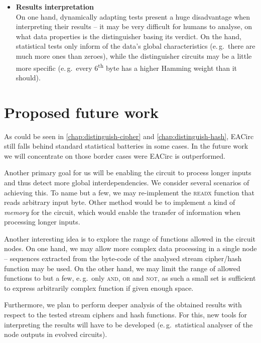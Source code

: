 \documentclass[12pt,oneside]{fithesis2}		%
\renewcommand{\_}{\leavevmode \kern0.0em\vbox{\hrule width0.4em}}
\newcommand{\squarebullet}{\textcolor{black}{\raisebox{0.15em}{\rule{4pt}{4pt}}}}
\newenvironment{myItemize}{
  \begin{itemize}[leftmargin=2em,rightmargin=1em,itemsep=\parskip ,parsep=0em,topsep=0em,partopsep=0em]
  \renewcommand{\labelitemi}{\squarebullet}
  \renewcommand{\labelitemii}{$\diamond$}
}{
  \end{itemize}
}
\begin{document}
\begin{myItemize}
While tests from standard statistical batteries look for a predefined evidence of non-randomness, distinguishers evolved
by EACirc dynamically adapt to the data stream. Thus, if a data stream changes its properties, the test will evolve accordingly
(predefined statistical tests never change).
\item \textbf{Results interpretation}\\
On one hand, dynamically adapting tests present a huge disadvantage when interpreting their results -- it may be very difficult for
humans to analyse, on what data properties is the distinguisher basing its verdict. 
On the hand, statistical tests only inform of the data's global
characteristics (e.\,g.\ there are much more ones than zeroes), while the distinguisher circuits may be a little more specific 
(e.\,g.\ every 6\textsuperscript{th} byte has a higher Hamming weight than it should).
\end{myItemize}

\section{Proposed future work}
\label{sec:outro-future-work}

As could be seen in \autoref{chap:distinguish-cipher} and \autoref{chap:distinguish-hash}, EACirc still falls behind standard 
statistical batteries in some cases. In the future work we will concentrate on those border cases were EACirc is outperformed.

Another primary goal for us will be enabling the circuit to process longer inputs and thus detect more global interdependencies.
We consider several scenarios of achieving this. To name but a few, we may re-implement the \textsc{readx} function that
reads arbitrary input byte. Other method would be to implement a kind of \textit{memory} for the circuit, which would enable
the transfer of information when processing longer inputs.

Another interesting idea is to explore the range of functions allowed in the circuit nodes. On one hand, we may allow more complex
data processing in a single node -- sequences extracted from the byte-code of the analysed stream cipher/hash function may be used.
On the other hand, we may limit the range of allowed functions to but a few, e.\,g.\ only \textsc{and}, \textsc{or} and \textsc{not},
as such a small set is sufficient to express arbitrarily complex function if given enough space.

Furthermore, we plan to perform deeper analysis of the obtained results with respect to the tested stream ciphers and hash functions.
For this, new tools for interpreting the results will have to be developed 
(e.\,g.\ statistical analyser of the node outputs in evolved circuits).
\end{document}
